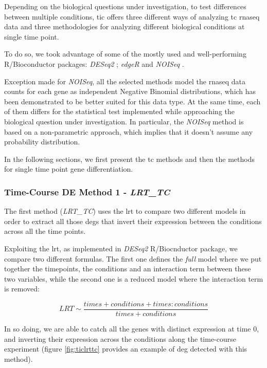 Depending on the biological questions under investigation, to test differences between multiple conditions, \gls{tic} offers three different ways of analyzing \gls{tc} \gls{rnaseq} data and three methodologies for analyzing different biological conditions at single time point.

To do so, we took advantage of some of the mostly used and well-performing \cite{Costa-Silva2017} R/Bioconductor packages: \textit{DESeq2} \cite{Love2014}; \textit{edgeR} \cite{Robinson2009} and \textit{NOISeq} \cite{Tarazona2011, Tarazona2015}.

Exception made for \textit{NOISeq}, all the selected methods model the \gls{rnaseq} data counts for each gene as independent Negative Binomial distributions, which has been demonstrated \cite{Robinson2007} to be better suited for this data type.
At the same time, each of them differs for the statistical test implemented while approaching the biological question under investigation.
In particular, the \textit{NOISeq} method is based on a non-parametric approach, which implies that it doesn't assume any probability distribution.

In the following sections, we first present the \gls{tc} methods and then the methods for single time point gene differentiation.

\subsubsection{Time-Course DE Method 1 - \textit{LRT\_TC}}
The first method (\textit{LRT\_TC}) uses the \gls{lrt} to compare two different models in order to extract all those \glspl{deg} that invert their expression between the conditions across all the time points.

Exploiting the \gls{lrt}, as implemented in \textit{DESeq2} R/Biocnductor package, we compare two different formulas.
The first one defines the \textit{full} model where we put together the timepoints, the conditions and an interaction term between these two variables, while the second one is a reduced model where the interaction term is removed:

\[LRT \sim \frac{times+conditions+times:conditions}{times+conditions}\]

In so doing, we are able to catch all the genes with distinct expression at time 0, and inverting their expression across the conditions along the time-course experiment (figure \ref{fig:ticlrttc} provides an example of \gls{deg} detected with this method). 

